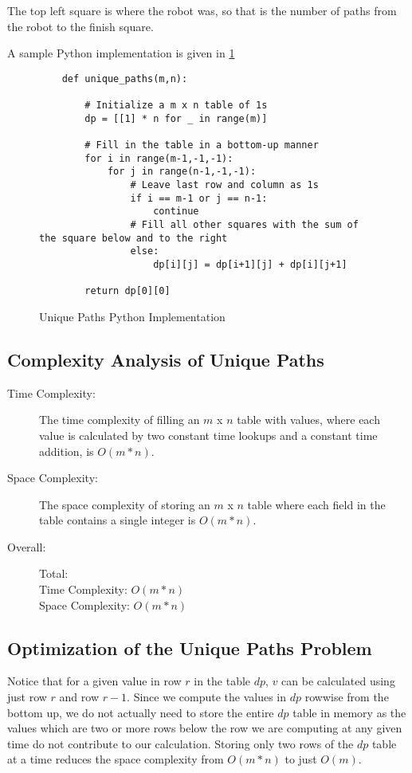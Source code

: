 The top left square is where the robot was, so that is the number of paths from the robot to the finish square.

A sample Python implementation is given in \ref{fig:unique-paths}
\begin{figure}[H]
    \centering
    \begin{lstlisting}
    def unique_paths(m,n):
    
        # Initialize a m x n table of 1s
        dp = [[1] * n for _ in range(m)]
    
        # Fill in the table in a bottom-up manner
        for i in range(m-1,-1,-1):
            for j in range(n-1,-1,-1):
                # Leave last row and column as 1s
                if i == m-1 or j == n-1:
                    continue
                # Fill all other squares with the sum of the square below and to the right
                else:
                    dp[i][j] = dp[i+1][j] + dp[i][j+1]

        return dp[0][0]
    \end{lstlisting}
    \caption{Unique Paths Python Implementation}
    \label{fig:unique-paths}
\end{figure}

\subsection*{Complexity Analysis of Unique Paths}\label{ca-unique-paths}

\begin{description}
    \item[Time Complexity:]
        The time complexity of filling an $m$ x $n$ table with values,
        where each value is calculated by two constant time lookups and a constant time addition, is $O(m * n)$.
        
    \item[Space Complexity:] 
        The space complexity of storing an $m$ x $n$ table where each field in the table contains a single integer is $O(m * n)$.

    \item[Overall:] Total:\\
        Time Complexity: $O(m * n)$\\
        Space Complexity: $O(m * n)$
    
\end{description}
\newpage

\subsection*{Optimization of the Unique Paths Problem}
Notice that for a given value in row $r$ in the table $dp$, $v$ can be calculated using just row $r$ and row $r-1$.
Since we compute the values in $dp$ rowwise from the bottom up, we do not actually need to store the entire $dp$ table in memory as the values which are two or more rows below the row we are computing at any given time do not contribute to our calculation.
Storing only two rows of the $dp$ table at a time reduces the space complexity from $O(m * n)$ to just $O(m)$.\\

